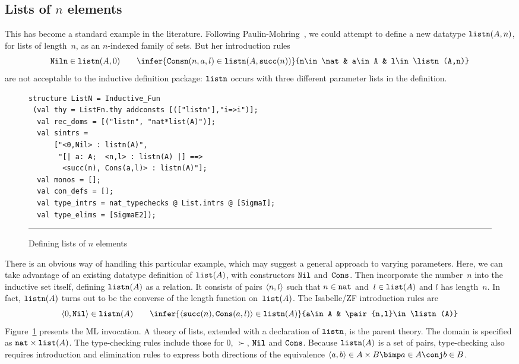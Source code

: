 \subsection{Lists of $n$ elements}\label{listn-sec}
This has become a standard example in the
literature.  Following Paulin-Mohring~\cite{paulin92}, we could attempt to
define a new datatype ${\tt listn}(A,n)$, for lists of length~$n$, as an $n$-indexed
family of sets.  But her introduction rules
\[ {\tt Niln}\in\listn(A,0)  \qquad
   \infer{{\tt Consn}(n,a,l)\in\listn(A,\succ(n))}
         {n\in\nat & a\in A & l\in\listn(A,n)}
\]
are not acceptable to the inductive definition package:
${\tt listn}$ occurs with three different parameter lists in the definition.

\begin{figure}
\begin{small}
\begin{verbatim}
structure ListN = Inductive_Fun
 (val thy = ListFn.thy addconsts [(["listn"],"i=>i")];
  val rec_doms = [("listn", "nat*list(A)")];
  val sintrs = 
      ["<0,Nil> : listn(A)",
       "[| a: A;  <n,l> : listn(A) |] ==> 
        <succ(n), Cons(a,l)> : listn(A)"];
  val monos = [];
  val con_defs = [];
  val type_intrs = nat_typechecks @ List.intrs @ [SigmaI];
  val type_elims = [SigmaE2]);
\end{verbatim}
\end{small}
\hrule
\caption{Defining lists of $n$ elements} \label{listn-fig}
\end{figure} 

There is an obvious way of handling this particular example, which may suggest
a general approach to varying parameters.  Here, we can take advantage of an
existing datatype definition of ${\tt list}(A)$, with constructors ${\tt Nil}$
and~${\tt Cons}$.  Then incorporate the number~$n$ into the inductive set itself,
defining ${\tt listn}(A)$ as a relation.  It consists of pairs $\langle n,l\rangle$ such
that $n\in{\tt nat}$ and~$l\in{\tt list}(A)$ and $l$ has length~$n$.  In fact,
${\tt listn}(A)$ turns out to be the converse of the length function on~${\tt list}(A)$. 
The Isabelle/ZF introduction rules are
\[ \pair{0,\Nil}\in\listn(A)  \qquad
   \infer{\pair{\succ(n),\Cons(a,l)}\in\listn(A)}
         {a\in A & \pair{n,l}\in\listn(A)}
\]
Figure~\ref{listn-fig} presents the ML invocation.  A theory of lists,
extended with a declaration of ${\tt listn}$, is the parent theory.  The domain
is specified as ${\tt nat}\times{\tt list}(A)$.  The type-checking rules include those
for 0, $\succ$, ${\tt Nil}$ and ${\tt Cons}$.  Because ${\tt listn}(A)$ is a set of pairs,
type-checking also requires introduction and elimination rules to express
both directions of the equivalence $\pair{a,b}\in A\times B \bimp a\in A
\conj b\in B$. 

